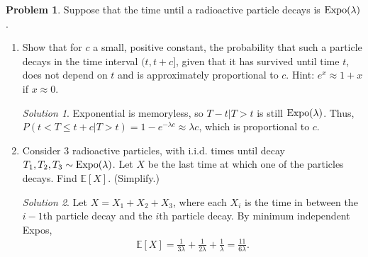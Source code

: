 \documentclass[11pt]{article}
\theoremstyle{definition}
\newtheorem{prob}[theo]{\color{Maroon} Problem}
\theoremstyle{remark}
\newtheorem*{soln}{\color{Maroon} Solution}
\newcommand{\E}[1]{\mathbb{E}\left[ #1 \right]}
\newcommand{\Expo}{\textnormal{Expo}}
\begin{document}
\begin{prob}Suppose that the time until a radioactive particle decays is $\Expo(\lambda)$.

\begin{enumerate}[label = (\alph*)]
    \item Show that for $c$ a small, positive constant, the probability that such a particle decays in the time interval $(t, t + c]$, given that it has survived until time $t$, does not depend on $t$ and is approximately proportional to $c$. Hint: $e^x \approx 1 + x$ if $x \approx 0$.
    
    \begin{soln} Exponential is memoryless, so $T -t | T > t$ is still $\Expo(\lambda)$. Thus, $P(t < T \le t + c | T > t) = 1 - e^{-\lambda c} \approx \lambda c$, which is proportional to $c$.
    \end{soln}
    
    \dotfill
    
    \item Consider $3$ radioactive particles, with i.i.d. times until decay $T_1, T_2, T_3 \sim \Expo(\lambda)$. Let $X$ be the last time at which one of the particles decays. Find $\E{X}$. (Simplify.)
    
    \begin{soln} Let $X = X_1 + X_2 + X_3$, where each $X_i$ is the time in between the $i-1$th particle decay and the $i$th particle decay. By minimum independent Expos, 
    \begin{align*}
        \E{X} = \frac{1}{3\lambda} + \frac{1}{2\lambda} + \frac{1}{\lambda} = \frac{11}{6\lambda}.
    \end{align*}
    \end{soln}
    
\end{enumerate}

\end{prob}

\pagebreak
\end{document}
